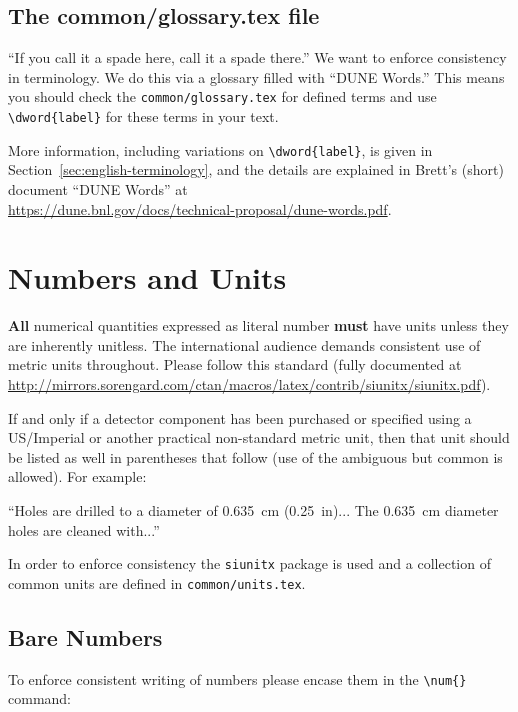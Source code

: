 \subsection{The common/glossary.tex file}

``If you call it a spade here, call it a spade there.'' We want to enforce consistency in terminology. We do this via a glossary filled with ``DUNE Words.''  This means you should check the \verb|common/glossary.tex| for defined terms and use \verb|\dword{label}| for these terms in your text.

 More information, including variations on \verb|\dword{label}|, is given in Section~\ref{sec:english-terminology}, and the details are explained in Brett's (short) document ``DUNE Words'' at \\
 \url{https://dune.bnl.gov/docs/technical-proposal/dune-words.pdf}.

\section{Numbers and Units}

\textbf{All} numerical quantities expressed as literal number
\textbf{must} have units unless they are inherently unitless.
The international audience demands consistent use of metric units throughout.  Please follow this standard (fully documented at \url{http://mirrors.sorengard.com/ctan/macros/latex/contrib/siunitx/siunitx.pdf}). 

If and only if  a detector component has been purchased or specified using a US/Imperial or another practical non-standard metric unit, then that unit should be listed as well in parentheses that follow (use of the ambiguous but common \si{\kt} is allowed). For example:

``Holes are drilled to a diameter of \SI{0.635}{cm} (\SI{0.25}{in})... The \SI{0.635}{cm} diameter holes are cleaned with...''

In order to enforce consistency the \texttt{siunitx} package is used
and a collection of common units are defined in
\texttt{common/units.tex}.


\subsection{Bare Numbers}

To enforce consistent writing of numbers please encase them in the
\verb|\num{}| command:

